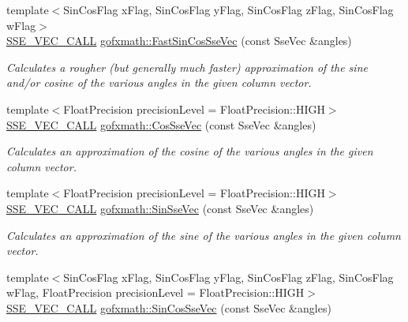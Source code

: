 \begin{DoxyCompactItemize}
{\footnotesize template$<$Sin\+Cos\+Flag x\+Flag, Sin\+Cos\+Flag y\+Flag, Sin\+Cos\+Flag z\+Flag, Sin\+Cos\+Flag w\+Flag$>$ }\\\hyperlink{ssevec__math__defs_8h_a97454f977a5281455cecacce1e8ba670}{S\+S\+E\+\_\+\+V\+E\+C\+\_\+\+C\+A\+L\+L} \hyperlink{group___s_i_m_d_vec_math_gafadb857fe7e6ccbe5f3c635e3c205258}{gofxmath\+::\+Fast\+Sin\+Cos\+Sse\+Vec} (const Sse\+Vec \&angles)
\begin{DoxyCompactList}\small\item\em Calculates a rougher (but generally much faster) approximation of the sine and/or cosine of the various angles in the given column vector. \end{DoxyCompactList}\item 
{\footnotesize template$<$Float\+Precision precision\+Level = Float\+Precision\+::\+H\+I\+G\+H$>$ }\\\hyperlink{ssevec__math__defs_8h_a97454f977a5281455cecacce1e8ba670}{S\+S\+E\+\_\+\+V\+E\+C\+\_\+\+C\+A\+L\+L} \hyperlink{group___s_i_m_d_vec_math_gacc1711e105bd1188ae80b9b8f7df2555}{gofxmath\+::\+Cos\+Sse\+Vec} (const Sse\+Vec \&angles)
\begin{DoxyCompactList}\small\item\em Calculates an approximation of the cosine of the various angles in the given column vector. \end{DoxyCompactList}\item 
{\footnotesize template$<$Float\+Precision precision\+Level = Float\+Precision\+::\+H\+I\+G\+H$>$ }\\\hyperlink{ssevec__math__defs_8h_a97454f977a5281455cecacce1e8ba670}{S\+S\+E\+\_\+\+V\+E\+C\+\_\+\+C\+A\+L\+L} \hyperlink{group___s_i_m_d_vec_math_gad3563d1afb9f13748de00a48a8a7b298}{gofxmath\+::\+Sin\+Sse\+Vec} (const Sse\+Vec \&angles)
\begin{DoxyCompactList}\small\item\em Calculates an approximation of the sine of the various angles in the given column vector. \end{DoxyCompactList}\item 
{\footnotesize template$<$Sin\+Cos\+Flag x\+Flag, Sin\+Cos\+Flag y\+Flag, Sin\+Cos\+Flag z\+Flag, Sin\+Cos\+Flag w\+Flag, Float\+Precision precision\+Level = Float\+Precision\+::\+H\+I\+G\+H$>$ }\\\hyperlink{ssevec__math__defs_8h_a97454f977a5281455cecacce1e8ba670}{S\+S\+E\+\_\+\+V\+E\+C\+\_\+\+C\+A\+L\+L} \hyperlink{group___s_i_m_d_vec_math_gadea0402aa6c42033d4bd68d8218bd966}{gofxmath\+::\+Sin\+Cos\+Sse\+Vec} (const Sse\+Vec \&angles)

\end{DoxyCompactItemize}
